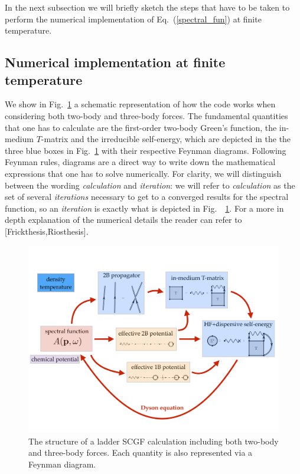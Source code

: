 In the next subsection we will briefly sketch the steps that have to be taken to perform the numerical implementation of Eq.~(\ref{spectral_fun}) at finite temperature.

\subsection{Numerical implementation at finite temperature}
We show in Fig.~\ref{num_impl} a schematic representation of how the code works when considering both two-body and three-body forces. %
The fundamental quantities that one has to calculate are the first-order two-body Green's function, the in-medium $T$-matrix and the irreducible self-energy, which are depicted in the the three blue boxes in Fig.~\ref{num_impl} with their respective Feynman diagrams. Following Feynman rules, diagrams are a direct way to write down the mathematical expressions that one has to solve numerically. For clarity, we will distinguish between the wording \emph{calculation} and \emph{iteration}: we will refer to \emph{calculation} as the set of several \emph{iterations} necessary to get to a converged results for the spectral function, so an \emph{iteration} is exactly what is depicted in Fig.~~\ref{num_impl}. For a more in depth explanation of the numerical details the reader can refer to [Frickthesis,Riosthesis].

 
\begin{figure}[t]
\begin{center}
\includegraphics[width=1.0\textwidth]{Chapter11-figures/numerical_scgf_diagrams.pdf}
\caption{The structure of a ladder SCGF calculation including both two-body and three-body forces. Each quantity is also represented via a Feynman diagram.}
\label{num_impl}
\end{center}
\end{figure}


